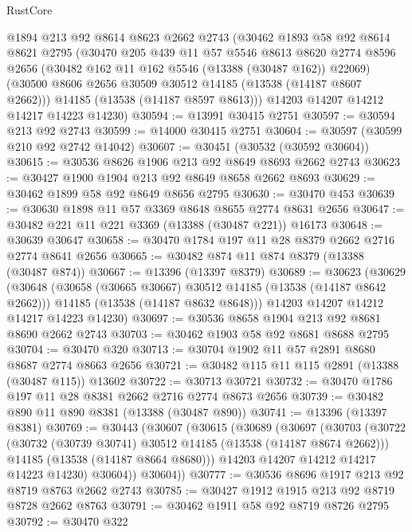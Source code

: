 \begin{lexlean}{RustCore}
\begin{coremodule}
    @1894
    @213
    @92
    @8614
    @8623
    @2662
    @2743
    (@30462
      @1893
      @58
      @92
      @8614
      @8621
      @2795
      (@30470
        @205
        @439
        @11
        @57
        @5546
        @8613
        @8620
        @2774
        @8596
        @2656
        (@30482 @162 @11 @162 @5546 (@13388 (@30487 @162)) @22069)
        (@30500 @8606 @2656 @30509 @30512 @14185 (@13538 (@14187 @8607 @2662)))
        @14185
        (@13538 (@14187 @8597 @8613)))
      @14203
      @14207
      @14212
      @14217
      @14223
      @14230)
@30594 := @13991 @30415 @2751
@30597 := @30594 @213 @92 @2743
@30599 := @14000 @30415 @2751
@30604 := @30597 (@30599 @210 @92 @2742 @14042)
@30607 := @30451 (@30532 (@30592 @30604))
@30615 := @30536 @8626 @1906 @213 @92 @8649 @8693 @2662 @2743
@30623 := @30427 @1900 @1904 @213 @92 @8649 @8658 @2662 @8693
@30629 := @30462 @1899 @58 @92 @8649 @8656 @2795
@30630 := @30470 @453
@30639 := @30630 @1898 @11 @57 @3369 @8648 @8655 @2774 @8631 @2656
@30647 := @30482 @221 @11 @221 @3369 (@13388 (@30487 @221)) @16173
@30648 := @30639 @30647
@30658 := @30470 @1784 @197 @11 @28 @8379 @2662 @2716 @2774 @8641 @2656
@30665 := @30482 @874 @11 @874 @8379 (@13388 (@30487 @874))
@30667 := @13396 (@13397 @8379)
@30689 := @30623
    (@30629
      (@30648
        (@30658 (@30665 @30667) @30512 @14185 (@13538 (@14187 @8642 @2662)))
        @14185
        (@13538 (@14187 @8632 @8648)))
      @14203
      @14207
      @14212
      @14217
      @14223
      @14230)
@30697 := @30536 @8658 @1904 @213 @92 @8681 @8690 @2662 @2743
@30703 := @30462 @1903 @58 @92 @8681 @8688 @2795
@30704 := @30470 @320
@30713 := @30704 @1902 @11 @57 @2891 @8680 @8687 @2774 @8663 @2656
@30721 := @30482 @115 @11 @115 @2891 (@13388 (@30487 @115)) @13602
@30722 := @30713 @30721
@30732 := @30470 @1786 @197 @11 @28 @8381 @2662 @2716 @2774 @8673 @2656
@30739 := @30482 @890 @11 @890 @8381 (@13388 (@30487 @890))
@30741 := @13396 (@13397 @8381)
@30769 := @30443
    (@30607
      (@30615
        (@30689
          (@30697
            (@30703
              (@30722
                (@30732 (@30739 @30741) @30512 @14185 (@13538 (@14187 @8674 @2662)))
                @14185
                (@13538 (@14187 @8664 @8680)))
              @14203
              @14207
              @14212
              @14217
              @14223
              @14230)
            @30604))
        @30604))
@30777 := @30536 @8696 @1917 @213 @92 @8719 @8763 @2662 @2743
@30785 := @30427 @1912 @1915 @213 @92 @8719 @8728 @2662 @8763
@30791 := @30462 @1911 @58 @92 @8719 @8726 @2795
@30792 := @30470 @322

\end{coremodule}
\end{lexlean}
